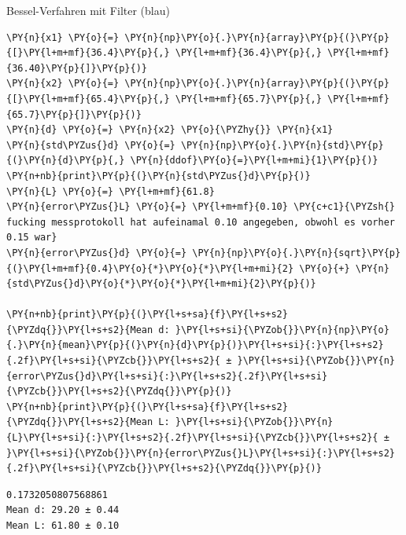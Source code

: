     Bessel-Verfahren mit Filter (blau)

    \begin{tcolorbox}[breakable, size=fbox, boxrule=1pt, pad at break*=1mm,colback=cellbackground, colframe=cellborder]
\begin{Verbatim}[commandchars=\\\{\}]
\PY{n}{x1} \PY{o}{=} \PY{n}{np}\PY{o}{.}\PY{n}{array}\PY{p}{(}\PY{p}{[}\PY{l+m+mf}{36.4}\PY{p}{,} \PY{l+m+mf}{36.4}\PY{p}{,} \PY{l+m+mf}{36.40}\PY{p}{]}\PY{p}{)}
\PY{n}{x2} \PY{o}{=} \PY{n}{np}\PY{o}{.}\PY{n}{array}\PY{p}{(}\PY{p}{[}\PY{l+m+mf}{65.4}\PY{p}{,} \PY{l+m+mf}{65.7}\PY{p}{,} \PY{l+m+mf}{65.7}\PY{p}{]}\PY{p}{)}
\PY{n}{d} \PY{o}{=} \PY{n}{x2} \PY{o}{\PYZhy{}} \PY{n}{x1}
\PY{n}{std\PYZus{}d} \PY{o}{=} \PY{n}{np}\PY{o}{.}\PY{n}{std}\PY{p}{(}\PY{n}{d}\PY{p}{,} \PY{n}{ddof}\PY{o}{=}\PY{l+m+mi}{1}\PY{p}{)}
\PY{n+nb}{print}\PY{p}{(}\PY{n}{std\PYZus{}d}\PY{p}{)}
\PY{n}{L} \PY{o}{=} \PY{l+m+mf}{61.8}
\PY{n}{error\PYZus{}L} \PY{o}{=} \PY{l+m+mf}{0.10} \PY{c+c1}{\PYZsh{} fucking messprotokoll hat aufeinamal 0.10 angegeben, obwohl es vorher 0.15 war}
\PY{n}{error\PYZus{}d} \PY{o}{=} \PY{n}{np}\PY{o}{.}\PY{n}{sqrt}\PY{p}{(}\PY{l+m+mf}{0.4}\PY{o}{*}\PY{o}{*}\PY{l+m+mi}{2} \PY{o}{+} \PY{n}{std\PYZus{}d}\PY{o}{*}\PY{o}{*}\PY{l+m+mi}{2}\PY{p}{)}

\PY{n+nb}{print}\PY{p}{(}\PY{l+s+sa}{f}\PY{l+s+s2}{\PYZdq{}}\PY{l+s+s2}{Mean d: }\PY{l+s+si}{\PYZob{}}\PY{n}{np}\PY{o}{.}\PY{n}{mean}\PY{p}{(}\PY{n}{d}\PY{p}{)}\PY{l+s+si}{:}\PY{l+s+s2}{.2f}\PY{l+s+si}{\PYZcb{}}\PY{l+s+s2}{ ± }\PY{l+s+si}{\PYZob{}}\PY{n}{error\PYZus{}d}\PY{l+s+si}{:}\PY{l+s+s2}{.2f}\PY{l+s+si}{\PYZcb{}}\PY{l+s+s2}{\PYZdq{}}\PY{p}{)}
\PY{n+nb}{print}\PY{p}{(}\PY{l+s+sa}{f}\PY{l+s+s2}{\PYZdq{}}\PY{l+s+s2}{Mean L: }\PY{l+s+si}{\PYZob{}}\PY{n}{L}\PY{l+s+si}{:}\PY{l+s+s2}{.2f}\PY{l+s+si}{\PYZcb{}}\PY{l+s+s2}{ ± }\PY{l+s+si}{\PYZob{}}\PY{n}{error\PYZus{}L}\PY{l+s+si}{:}\PY{l+s+s2}{.2f}\PY{l+s+si}{\PYZcb{}}\PY{l+s+s2}{\PYZdq{}}\PY{p}{)}
\end{Verbatim}
\end{tcolorbox}

    \begin{Verbatim}[commandchars=\\\{\}]
0.1732050807568861
Mean d: 29.20 ± 0.44
Mean L: 61.80 ± 0.10
    \end{Verbatim}


